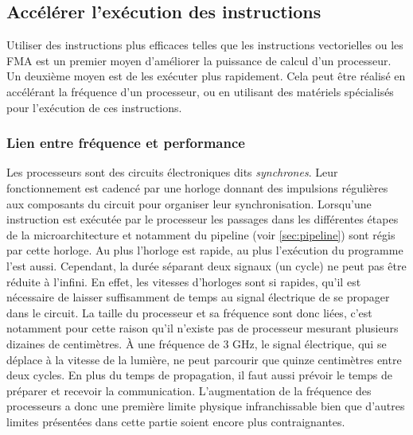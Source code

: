 \subsection{Accélérer l'exécution des instructions} \label{sec:accelerer}

Utiliser des instructions plus efficaces telles que les instructions vectorielles ou les FMA est un premier moyen d’améliorer la puissance de calcul d’un processeur. Un deuxième moyen est de les exécuter plus rapidement. Cela peut être réalisé en accélérant la fréquence d’un processeur, ou en utilisant des matériels spécialisés pour l’exécution de ces instructions.

\subsubsection{Lien entre fréquence et performance} \label{sec:frequency}
Les processeurs sont des circuits électroniques dits \textit{synchrones}. Leur fonctionnement est cadencé par une horloge donnant des impulsions régulières aux composants du circuit pour organiser leur synchronisation. Lorsqu'une instruction est exécutée par le processeur les passages dans les différentes étapes de la microarchitecture et notamment du pipeline (voir \autoref{sec:pipeline}) sont régis par cette horloge. Au plus l'horloge est rapide, au plus l'exécution du programme l'est aussi. Cependant, la durée séparant deux signaux (un cycle) ne peut pas être réduite à l'infini. En effet, les vitesses d'horloges sont si rapides, qu'il est nécessaire de laisser suffisamment de temps au signal électrique de se propager dans le circuit. La taille du processeur et sa fréquence sont donc liées, c'est notamment pour cette raison qu'il n'existe pas de processeur mesurant plusieurs dizaines de centimètres. À une fréquence de 3 GHz, le signal électrique, qui se déplace à la vitesse de la lumière, ne peut parcourir que quinze centimètres entre deux cycles. En plus du temps de propagation, il faut aussi prévoir le temps de préparer et recevoir la communication. L'augmentation de la fréquence des processeurs a donc une première limite physique infranchissable bien que d'autres limites présentées dans cette partie soient encore plus contraignantes.

